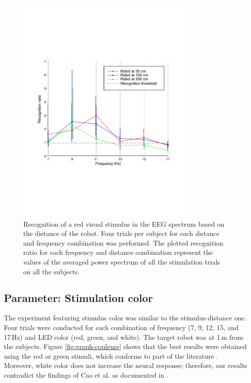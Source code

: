 \documentclass[smallextended]{svjour3}
\begin{document}
\begin{figure}
\center
\includegraphics[width=0.8\textwidth]{figures/graph-distances.pdf}
\caption{Recognition of a red visual stimulus in the EEG spectrum based on the distance of the robot. Four trials per subject for each distance and frequency combination was performed. The plotted recognition ratio for each frequency and distance combination represent the values of the averaged power spectrum of all the stimulation trials on all the subjects.}
\label{fig:graph-distances}
\end{figure}
\subsection{Parameter: Stimulation color}
The experiment featuring stimulus color was similar to the stimulus-distance one. Four trials were conducted for each combination of frequency (7, 9, 12, 15, and 17\,Hz) and LED color (red, green, and white). The target robot was at 1\,m from the subjects. Figure \ref{fig:graph-couleurs} shows that the best results were obtained using the red or green stimuli, which conforms to part of the literature \cite{chua2004effects,duvinage2013performance,Faller2010,hvaring2014comparison}. Moreover, white color does not increase the neural response; therefore, our results contradict the findings of Cao et al. as documented in \cite{cao2012flashing}. 
\end{document}

